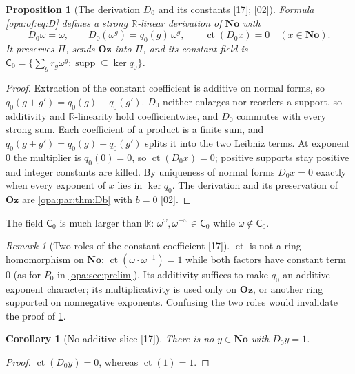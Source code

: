 \documentclass[11pt,oneside]{article}
\numberwithin{equation}{section}
\newtheorem{proposition}[proposition]{Proposition}
\newtheorem{corollary}[corollary]{Corollary}
\theoremstyle{definition}
\theoremstyle{remark}
\newtheorem{remark}[remark]{Remark}
\newcommand{\No}{\mathbf{No}}
\newcommand{\Oz}{\mathbf{Oz}}
\newcommand{\R}{\mathbb R}
\newcommand{\supp}{\operatorname{supp}}
\newcommand{\ct}{\operatorname{ct}}
\newcommand{\src}[1]{\textup{\textsf{\small[#1]}}}
\begin{document}
\begin{proposition}[The derivation $D_0$ and its constants \src{17}; \src{02}]\label{opa:of:prop:D}
Formula \eqref{opa:of:eq:D} defines a strong $\R$-linear derivation of $\No$ with
\begin{equation}\label{opa:of:eq:Dfacts}
 D_0\omega=\omega,\qquad D_0(\omega^g)=q_0(g)\,\omega^g,\qquad \ct(D_0x)=0\quad(x\in\No).
\end{equation}
It preserves $\Pi$, sends $\Oz$ into $\Pi$, and its constant field is
$\mathsf C_0=\bigl\{\sum_gr_g\omega^g:\supp\subseteq\ker q_0\bigr\}$.
\end{proposition}
\begin{proof}
Extraction of the constant coefficient is additive on normal forms, so $q_0(g+g')=q_0(g)+q_0(g')$. $D_0$ neither enlarges
nor reorders a support, so additivity and $\R$-linearity hold coefficientwise, and $D_0$ commutes with every strong sum.
Each coefficient of a product is a finite sum, and $q_0(g+g')=q_0(g)+q_0(g')$ splits it into the two Leibniz terms. At
exponent $0$ the multiplier is $q_0(0)=0$, so $\ct(D_0x)=0$; positive supports stay positive and integer constants are
killed. By uniqueness of normal forms $D_0x=0$ exactly when every exponent of $x$ lies in $\ker q_0$. The derivation and its
preservation of $\Oz$ are \cref{opa:par:thm:Db} with $b=0$ \src{02}.
\end{proof}

The field $\mathsf C_0$ is much larger than $\R$: $\omega^\omega,\omega^{-\omega}\in\mathsf C_0$ while $\omega\notin\mathsf C_0$.

\begin{remark}[Two roles of the constant coefficient \src{17}]\label{opa:of:rem:ct}
$\ct$ is not a ring homomorphism on $\No$: $\ct(\omega\cdot\omega^{-1})=1$ while both factors have constant term $0$ (as
for $P_0$ in \cref{opa:sec:prelim}). Its additivity suffices to make $q_0$ an additive exponent character; its
multiplicativity is used only on $\Oz$, or another ring supported on nonnegative exponents. Confusing the two roles would
invalidate the proof of \cref{opa:of:prop:D}.
\end{remark}

\begin{corollary}[No additive slice \src{17}]\label{opa:of:cor:noslice}
There is no $y\in\No$ with $D_0y=1$.
\end{corollary}
\begin{proof}
$\ct(D_0y)=0$, whereas $\ct(1)=1$.
\end{proof}
\end{document}
